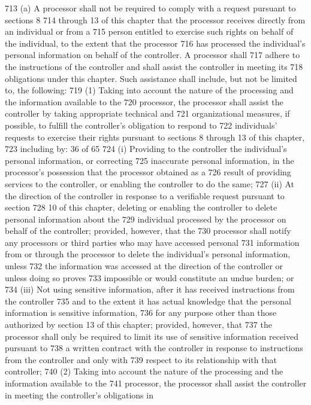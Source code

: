 713 (a) A processor shall not be required to comply with a request pursuant to sections 8
714 through 13 of this chapter that the processor receives directly from an individual or from a
715 person entitled to exercise such rights on behalf of the individual, to the extent that the processor
716 has processed the individual’s personal information on behalf of the controller. A processor shall
717 adhere to the instructions of the controller and shall assist the controller in meeting its
718 obligations under this chapter. Such assistance shall include, but not be limited to, the following:
719 (1) Taking into account the nature of the processing and the information available to the
720 processor, the processor shall assist the controller by taking appropriate technical and
721 organizational measures, if possible, to fulfill the controller’s obligation to respond to
722 individuals’ requests to exercise their rights pursuant to sections 8 through 13 of this chapter,
723 including by:
36 of 65
724 (i) Providing to the controller the individual’s personal information, or correcting
725 inaccurate personal information, in the processor’s possession that the processor obtained as a
726 result of providing services to the controller, or enabling the controller to do the same;
727 (ii) At the direction of the controller in response to a verifiable request pursuant to section
728 10 of this chapter, deleting or enabling the controller to delete personal information about the
729 individual processed by the processor on behalf of the controller; provided, however, that the
730 processor shall notify any processors or third parties who may have accessed personal
731 information from or through the processor to delete the individual’s personal information, unless
732 the information was accessed at the direction of the controller or unless doing so proves
733 impossible or would constitute an undue burden; or
734 (iii) Not using sensitive information, after it has received instructions from the controller
735 and to the extent it has actual knowledge that the personal information is sensitive information,
736 for any purpose other than those authorized by section 13 of this chapter; provided, however, that
737 the processor shall only be required to limit its use of sensitive information received pursuant to
738 a written contract with the controller in response to instructions from the controller and only with
739 respect to its relationship with that controller;
740 (2) Taking into account the nature of the processing and the information available to the
741 processor, the processor shall assist the controller in meeting the controller’s obligations in

